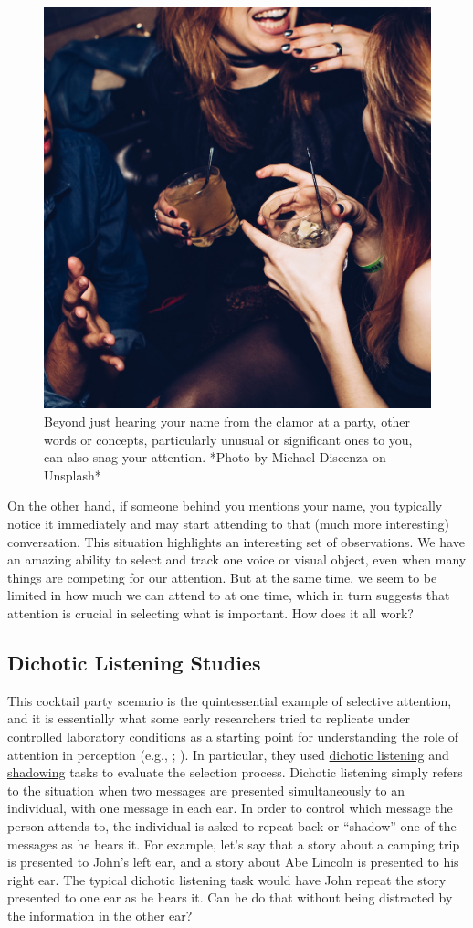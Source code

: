 \documentclass[
]{krantz}
\begin{document}
\begin{figure}

{\centering \includegraphics[width=0.45\linewidth]{images/3_attention/cocktailparty} 

}

\caption{Beyond just hearing your name from the clamor at a party, other words or concepts, particularly unusual or significant ones to you, can also snag your attention. *Photo by Michael Discenza on Unsplash*}\label{fig:cocktailparty}
\end{figure}

On the other hand, if someone behind you mentions your name, you typically notice it immediately and may start attending to that (much more interesting) conversation. This situation highlights an interesting set of observations. We have an amazing ability to select and track one voice or visual object, even when many things are competing for our attention. But at the same time, we seem to be limited in how much we can attend to at one time, which in turn suggests that attention is crucial in selecting what is important. How does it all work?

\subsection*{Dichotic Listening Studies}\label{dichotic-listening-studies}


This cocktail party scenario is the quintessential example of selective attention, and it is essentially what some early researchers tried to replicate under controlled laboratory conditions as a starting point for understanding the role of attention in perception (e.g., ; ). In particular, they used \hyperref[dichotic-listening]{dichotic listening} and \hyperref[shadowing]{shadowing} tasks to evaluate the selection process. Dichotic listening simply refers to the situation when two messages are presented simultaneously to an individual, with one message in each ear. In order to control which message the person attends to, the individual is asked to repeat back or ``shadow'' one of the messages as he hears it. For example, let's say that a story about a camping trip is presented to John's left ear, and a story about Abe Lincoln is presented to his right ear. The typical dichotic listening task would have John repeat the story presented to one ear as he hears it. Can he do that without being distracted by the information in the other ear?
\end{document}
